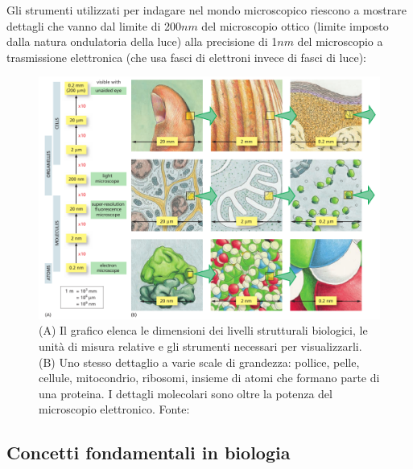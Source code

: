 \par Gli strumenti utilizzati per indagare nel mondo microscopico riescono a mostrare dettagli che vanno dal limite di 200$nm$ del microscopio ottico (limite imposto dalla natura ondulatoria della luce) alla precisione di 1$nm$ del microscopio a trasmissione elettronica (che usa fasci di elettroni invece di fasci di luce):

\begin{figure}[!h]
	\centering
	\includegraphics[scale=0.6]{images/grandezze.png}
	\caption{(A) Il grafico elenca le dimensioni dei livelli strutturali biologici, le unità di misura relative e gli strumenti necessari per visualizzarli. (B) Uno stesso dettaglio a varie scale di grandezza: pollice, pelle, cellule, mitocondrio, ribosomi, insieme di atomi che formano parte di una proteina. I dettagli molecolari sono oltre la potenza del microscopio elettronico. Fonte: \cite{alberts2018essential}}
	\label{fig:microscopi-grandezze}
\end{figure}

\subsection{Concetti fondamentali in biologia}

